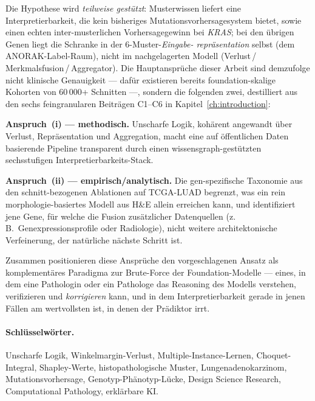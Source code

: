 Die Hypothese wird \emph{teilweise gestützt}: Musterwissen liefert
eine Interpretierbarkeit, die kein bisheriges
Mutationsvorhersagesystem bietet, sowie einen echten
inter-musterlichen Vorhersagegewinn bei \textit{KRAS}; bei den
übrigen Genen liegt die Schranke in der 6-Muster-\emph{Eingabe-%
repräsentation} selbst (dem ANORAK-Label-Raum), nicht im
nachgelagerten Modell (Verlust\,/\,Merkmalsfusion\,/\,Aggregator).
Die Hauptansprüche dieser Arbeit sind demzufolge nicht klinische
Genauigkeit --- dafür existieren bereits foundation-skalige
Kohorten von 60\,000+ Schnitten ---, sondern die folgenden zwei,
destilliert aus den sechs feingranularen Beiträgen C1--C6 in
Kapitel~\ref{ch:introduction}:

\textbf{Anspruch~(i) --- methodisch.}
Unscharfe Logik, kohärent angewandt über Verlust, Repräsentation
und Aggregation, macht eine auf öffentlichen Daten basierende
Pipeline transparent durch einen wissensgraph-gestützten
sechsstufigen Interpretierbarkeits-Stack.

\textbf{Anspruch~(ii) --- empirisch/analytisch.}
Die gen-spezifische Taxonomie aus den schnitt-bezogenen Ablationen
auf TCGA-LUAD begrenzt, was ein rein morphologie-basiertes Modell
aus H\&E allein erreichen kann, und identifiziert jene Gene, für
welche die Fusion zusätzlicher Datenquellen (z.\,B.\
Genexpressionsprofile oder Radiologie), nicht weitere
architektonische Verfeinerung, der natürliche nächste Schritt ist.

Zusammen positionieren diese Ansprüche den vorgeschlagenen Ansatz
als komplementäres Paradigma zur Brute-Force der
Foundation-Modelle --- eines, in dem eine Pathologin oder ein
Pathologe das Reasoning des Modells verstehen, verifizieren und
\emph{korrigieren} kann, und in dem Interpretierbarkeit gerade in
jenen Fällen am wertvollsten ist, in denen der Prädiktor irrt.

\paragraph{Schlüsselwörter.}
Unscharfe Logik, Winkelmargin-Verlust, Multiple-Instance-Lernen,
Choquet-Integral, Shapley-Werte, histopathologische Muster,
Lungenadenokarzinom, Mutationsvorhersage,
Genotyp-Phänotyp-Lücke, Design Science Research,
Computational Pathology, erklärbare KI.
